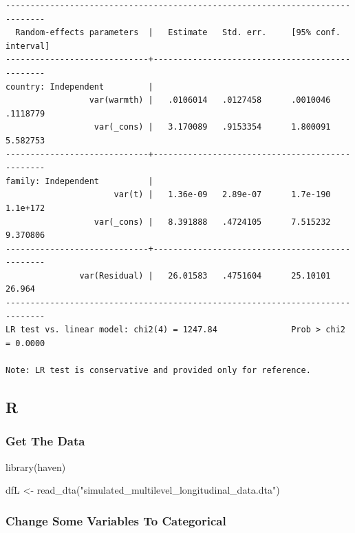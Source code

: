 \documentclass[
  letterpaper,
  DIV=11,
  numbers=noendperiod]{scrreprt}
\newenvironment{Shaded}{\begin{snugshade}}{\end{snugshade}}
\newcommand{\FunctionTok}[1]{\textcolor[rgb]{0.28,0.35,0.67}{#1}}
\newcommand{\NormalTok}[1]{\textcolor[rgb]{0.00,0.23,0.31}{#1}}
\newcommand{\OtherTok}[1]{\textcolor[rgb]{0.00,0.23,0.31}{#1}}
\newcommand{\SpecialCharTok}[1]{\textcolor[rgb]{0.37,0.37,0.37}{#1}}
\newcommand{\StringTok}[1]{\textcolor[rgb]{0.13,0.47,0.30}{#1}}
\begin{document}
\begin{verbatim}
------------------------------------------------------------------------------
  Random-effects parameters  |   Estimate   Std. err.     [95% conf. interval]
-----------------------------+------------------------------------------------
country: Independent         |
                 var(warmth) |   .0106014   .0127458      .0010046    .1118779
                  var(_cons) |   3.170089   .9153354      1.800091    5.582753
-----------------------------+------------------------------------------------
family: Independent          |
                      var(t) |   1.36e-09   2.89e-07      1.7e-190    1.1e+172
                  var(_cons) |   8.391888   .4724105      7.515232    9.370806
-----------------------------+------------------------------------------------
               var(Residual) |   26.01583   .4751604      25.10101      26.964
------------------------------------------------------------------------------
LR test vs. linear model: chi2(4) = 1247.84               Prob > chi2 = 0.0000

Note: LR test is conservative and provided only for reference.
\end{verbatim}

\subsection{R}

\subsubsection{Get The Data}\label{get-the-data-4}

\begin{Shaded}
\begin{Highlighting}[]
\FunctionTok{library}\NormalTok{(haven)}

\NormalTok{dfL }\OtherTok{\textless{}{-}} \FunctionTok{read\_dta}\NormalTok{(}\StringTok{"simulated\_multilevel\_longitudinal\_data.dta"}\NormalTok{)}
\end{Highlighting}
\end{Shaded}

\subsubsection{Change Some Variables To
Categorical}\label{change-some-variables-to-categorical-2}

\begin{Shaded}
\end{Shaded}
\end{document}
